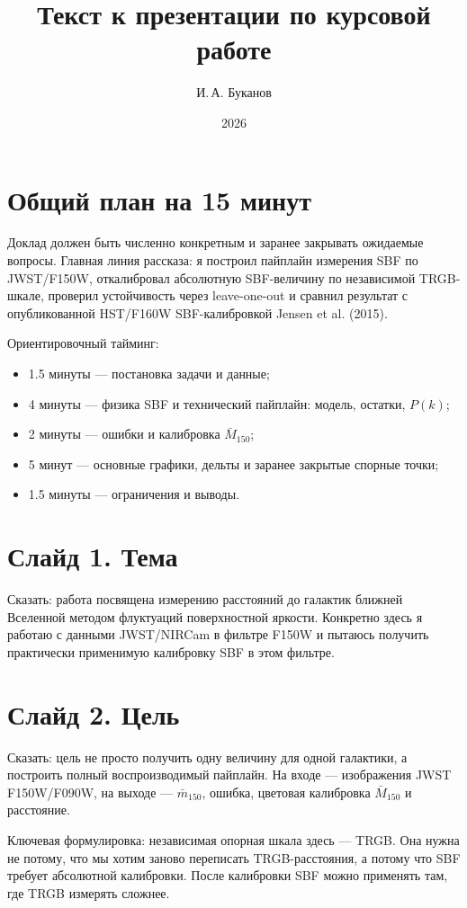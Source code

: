 \documentclass[12pt]{article}
\title{Текст к презентации по курсовой работе}
\author{И.\,А. Буканов}
\date{2026}
\begin{document}
\maketitle

\section*{Общий план на 15 минут}

Доклад должен быть численно конкретным и заранее закрывать ожидаемые вопросы. Главная линия рассказа:
я построил пайплайн измерения SBF по JWST/F150W, откалибровал абсолютную SBF-величину по независимой TRGB-шкале, проверил устойчивость через leave-one-out и сравнил результат с опубликованной HST/F160W SBF-калибровкой Jensen et al. (2015).

Ориентировочный тайминг:
\begin{itemize}
    \item 1.5 минуты --- постановка задачи и данные;
    \item 4 минуты --- физика SBF и технический пайплайн: модель, остатки, $P(k)$;
    \item 2 минуты --- ошибки и калибровка $\bar{M}_{150}$;
    \item 5 минут --- основные графики, дельты и заранее закрытые спорные точки;
    \item 1.5 минуты --- ограничения и выводы.
\end{itemize}

\section*{Слайд 1. Тема}

Сказать: работа посвящена измерению расстояний до галактик ближней Вселенной методом флуктуаций поверхностной яркости. Конкретно здесь я работаю с данными JWST/NIRCam в фильтре F150W и пытаюсь получить практически применимую калибровку SBF в этом фильтре.

\section*{Слайд 2. Цель}

Сказать: цель не просто получить одну величину для одной галактики, а построить полный воспроизводимый пайплайн. На входе --- изображения JWST F150W/F090W, на выходе --- $\bar{m}_{150}$, ошибка, цветовая калибровка $\bar{M}_{150}$ и расстояние.

Ключевая формулировка: независимая опорная шкала здесь --- TRGB. Она нужна не потому, что мы хотим заново переписать TRGB-расстояния, а потому что SBF требует абсолютной калибровки. После калибровки SBF можно применять там, где TRGB измерять сложнее.
\end{document}
